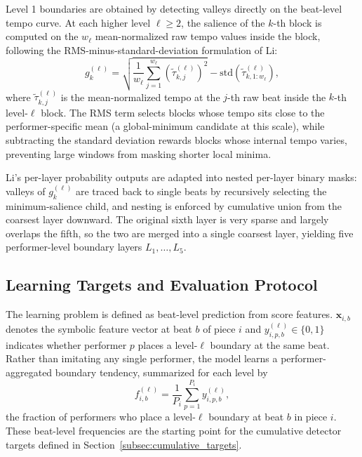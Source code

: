 \documentclass{article}
\begin{document}
Level 1 boundaries are obtained by detecting valleys directly on the beat-level tempo curve. At each higher level $\ell \geq 2$, the salience of the $k$-th block is computed on the $w_\ell$ mean-normalized raw tempo values inside the block, following the RMS-minus-standard-deviation formulation of Li:
\begin{equation}
g_{k}^{(\ell)} =
\sqrt{\frac{1}{w_{\ell}}\sum_{j=1}^{w_{\ell}} \left(\tilde{\tau}_{k,j}^{(\ell)}\right)^2}
- \mathrm{std}\!\left(\tilde{\tau}_{k,1:w_{\ell}}^{(\ell)}\right),
\end{equation}
where $\tilde{\tau}_{k,j}^{(\ell)}$ is the mean-normalized tempo at the $j$-th raw beat inside the $k$-th level-$\ell$ block. The RMS term selects blocks whose tempo sits close to the performer-specific mean (a global-minimum candidate at this scale), while subtracting the standard deviation rewards blocks whose internal tempo varies, preventing large windows from masking shorter local minima.

Li's per-layer probability outputs are adapted into nested per-layer binary masks: valleys of $g_k^{(\ell)}$ are traced back to single beats by recursively selecting the minimum-salience child, and nesting is enforced by cumulative union from the coarsest layer downward. The original sixth layer is very sparse and largely overlaps the fifth, so the two are merged into a single coarsest layer, yielding five performer-level boundary layers $L_1,\ldots,L_5$. 

\subsection{Learning Targets and Evaluation Protocol}\label{subsec:targets_protocol}

The learning problem is defined as beat-level prediction from score features. $\mathbf{x}_{i,b}$ denotes the symbolic feature vector at beat $b$ of piece $i$ and $y_{i,p,b}^{(\ell)} \in \{0,1\}$ indicates whether performer $p$ places a level-$\ell$ boundary at the same beat. Rather than imitating any single performer, the model learns a performer-aggregated boundary tendency, summarized for each level by
\begin{equation}
f_{i,b}^{(\ell)} = \frac{1}{P_i}\sum_{p=1}^{P_i} y_{i,p,b}^{(\ell)},
\end{equation}
the fraction of performers who place a level-$\ell$ boundary at beat $b$ in piece $i$. These beat-level frequencies are the starting point for the cumulative detector targets defined in Section~\ref{subsec:cumulative_targets}.
\end{document}
